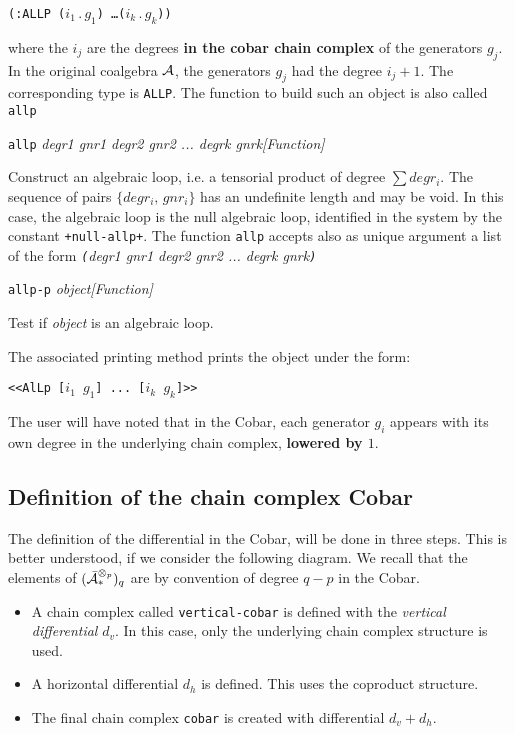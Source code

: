 \begin{center} {\tt (:ALLP  ($i_1\,.\, g_1$) \ldots ($i_k\,.\, g_k$))} \end{center}
where the $i_j$ are the degrees {\bf in the cobar chain complex} of the generators $g_j$.
In the original coalgebra $\cal A$, the generators $g_j$ had the degree $i_j+1$.
The corresponding type is {\tt ALLP}.
The function to build such an object is also called {\tt allp}
\vskip 0.35cm
{\parindent=0mm
{\leftskip=5mm 
{\tt allp} {\em  degr1 gnr1 degr2 gnr2 ... degrk gnrk}\hfill {\em [Function]} \par}
{\leftskip=15mm 
Construct an algebraic loop, i.e. a  tensorial product of degree $\sum degr_i$. The sequence of pairs
$\lbrace degr_i,\,  gnr_i \rbrace$ has an undefinite length and  may be void. In this case,  the algebraic loop
is the null algebraic loop, identified in the system by the constant {\tt +null-allp+}. 
The function {\tt allp} accepts also as unique argument a list of the form
{\em  {\tt (}degr1 gnr1 degr2 gnr2 ... degrk gnrk{\tt )}}    \par}
{\leftskip=5mm 
{\tt allp-p} {\em object}\hfill {\em [Function]} \par}
{\leftskip=15mm 
Test if {\em object} is an algebraic loop. \par}
}
\vskip 0.35cm
The associated printing  method prints the object under the form:
\begin{center} 
{\tt <<AlLp [$i_1$ $g_1$] ... [$i_k$ $g_k$]>>}
\end{center}
The user will have noted that in the Cobar, each generator $g_i$ appears with its own degree in the
underlying chain complex, {\bf lowered by $1$}. 

\subsection {Definition of the chain complex Cobar}

The definition of the differential in the Cobar, 
will be done in three steps. This is better understood,
if we consider the following diagram. We recall that the elements of $({\bar{\cal A}}_*^{\otimes_p})_q$ are
by convention of degree $q-p$ in the Cobar. 
\begin{itemize}
\item A chain complex called {\tt vertical-cobar} is defined with the {\em vertical differential} $d_v$.
In this case, only the  underlying  chain complex structure is used.
\item A horizontal differential $d_h$ is defined. This uses  the co\-pro\-duct structure.
\item The final chain complex {\tt cobar} is created with differential $d_v+d_h$.
\end{itemize}

